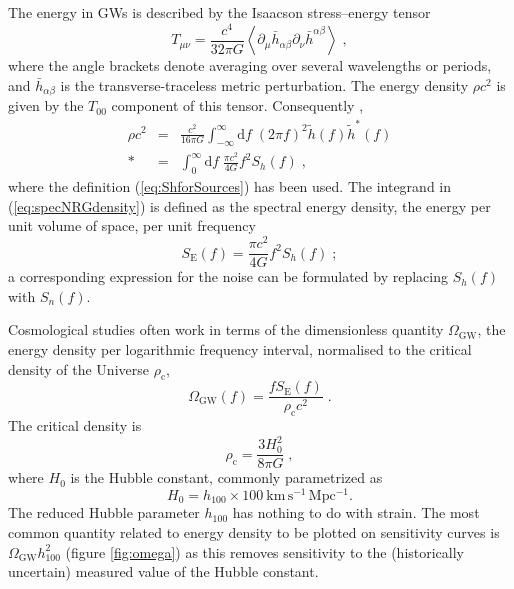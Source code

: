 The energy in GWs is described by the Isaacson stress--energy tensor \citep[section 35.15]{MTW}
\begin{equation}
T_{\mu\nu}=\frac{c^{4}}{32\pi G}\left<\partial_{\mu}\bar{h}_{\alpha\beta}\partial_{\nu}\bar{h}^{\alpha\beta}\right> \;,
\end{equation}
where the angle brackets denote averaging over several wavelengths or periods, and $\bar{h}_{\alpha\beta}$ is the transverse-traceless metric perturbation. The energy density $\rho c^{2}$ is given by the $T_{00}$ component of this tensor. Consequently \citep[cf.][]{Berry2013},
\begin{eqnarray}
\rho c^{2} &=& \frac{c^{2}}{16\pi G}\int_{-\infty}^{\infty}\mathrm{d}f\;\left(2\pi f\right)^{2}\tilde{h}(f)\tilde{h}^{*}(f) \\*
 &=& \int_{0}^{\infty}\mathrm{d}f\;\frac{\pi c^{2}}{4G}f^{2}S_{h}(f)\; , \label{eq:specNRGdensity}
\end{eqnarray} 
where the definition (\ref{eq:ShforSources}) has been used. The integrand in (\ref{eq:specNRGdensity}) is defined as the spectral energy density, the energy per unit volume of space, per unit frequency \citep{HellingsDowns}
\begin{equation}\label{eq:spectralenergydensity}
S_{\mathrm{E}}(f)=\frac{\pi c^{2}}{4G} f^{2}S_{h}(f) \; ;
\end{equation}
a corresponding expression for the noise can be formulated by replacing $S_h(f)$ with $S_{n}(f)$.

Cosmological studies often work in terms of the dimensionless quantity $\Omega_{\mathrm{GW}}$, the energy density per logarithmic frequency interval, normalised to the critical density of the Universe $\rho_{\mathrm{c}}$,
\begin{equation}
\label{eq:omega}
\Omega_\mathrm{GW}(f) = \frac{fS_{\mathrm{E}}(f)}{\rho_{\mathrm{c}}c^{2}} \; .
\end{equation}
The critical density is
\begin{equation}
\label{eq:crit-density}
\rho_{\mathrm{c}}=\frac{3H_{0}^{2}}{8\pi G} \;,
\end{equation}
where $H_{0}$ is the Hubble constant, commonly parametrized as
\begin{equation}
H_0 = h_{100}\times 100~\mathrm{km\,s^{-1}\,Mpc^{-1}}.
\end{equation}
The reduced Hubble parameter $h_{100}$ has nothing to do with strain. The most common quantity related to energy density to be plotted on sensitivity curves is $\Omega_{\mathrm{GW}}h_{100}^{2}$ (figure \ref{fig:omega}) as this removes sensitivity to the (historically uncertain) measured value of the Hubble constant.

